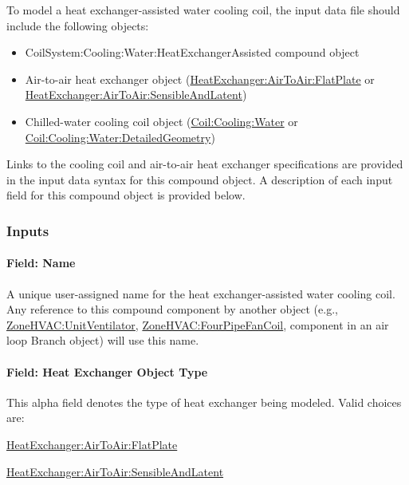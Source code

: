 To model a heat exchanger-assisted water cooling coil, the input data file should include the following objects:

\begin{itemize}
\item
  CoilSystem:Cooling:Water:HeatExchangerAssisted compound object
\item
  Air-to-air heat exchanger object (\hyperref[heatexchangerairtoairflatplate]{HeatExchanger:AirToAir:FlatPlate} or \hyperref[heatexchangerairtoairsensibleandlatent]{HeatExchanger:AirToAir:SensibleAndLatent})
\item
  Chilled-water cooling coil object (\hyperref[coilcoolingwater]{Coil:Cooling:Water} or \hyperref[coilcoolingwaterdetailedgeometry]{Coil:Cooling:Water:DetailedGeometry})
\end{itemize}

Links to the cooling coil and air-to-air heat exchanger specifications are provided in the input data syntax for this compound object. A description of each input field for this compound object is provided below.

\subsubsection{Inputs}\label{inputs-26}

\paragraph{Field: Name}\label{field-name-25-000}

A unique user-assigned name for the heat exchanger-assisted water cooling coil. Any reference to this compound component by another object (e.g., \hyperref[zonehvacunitventilator]{ZoneHVAC:UnitVentilator}, \hyperref[zonehvacfourpipefancoil]{ZoneHVAC:FourPipeFanCoil}, component in an air loop Branch object) will use this name.

\paragraph{Field: Heat Exchanger Object Type}\label{field-heat-exchanger-object-type-1}

This alpha field denotes the type of heat exchanger being modeled. Valid choices are:

\hyperref[heatexchangerairtoairflatplate]{HeatExchanger:AirToAir:FlatPlate}

\hyperref[heatexchangerairtoairsensibleandlatent]{HeatExchanger:AirToAir:SensibleAndLatent}

